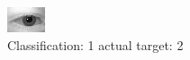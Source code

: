 \begin{figure}[h!]
\begin{center}
\includegraphics[width=0.60\columnwidth]{figures/ID378_class_1_target_2.png}
\end{center}
\caption{ Classification: 1 actual target: 2}
\label{fig:ID378_class_1_target_2}
\end{figure}
